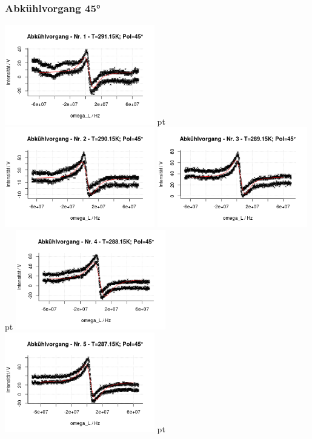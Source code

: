 \documentclass[12pt]{article}
\begin{document}
\subsubsection{Abkühlvorgang 45°}
\begin{minipage}[h!]{\textwidth}
	\centering
	\includegraphics[width=0.49\textwidth]{figures/cold45-1.png} pt
	\includegraphics[width=0.49\textwidth]{figures/cold45-2.png}\vskip -10pt
	\includegraphics[width=0.49\textwidth]{figures/cold45-3.png} pt
	\includegraphics[width=0.49\textwidth]{figures/cold45-4.png}\vskip -10pt
	\includegraphics[width=0.49\textwidth]{figures/cold45-5.png} pt

\end{minipage}
\end{document}
